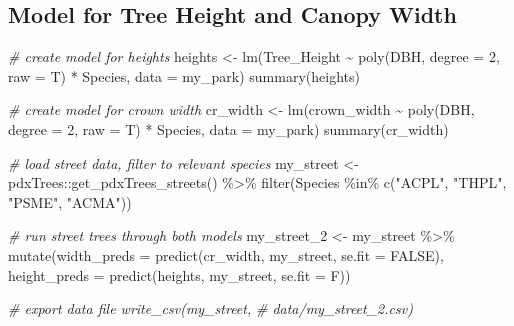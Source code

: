 \documentclass[12pt,twoside]{reedthesis}
\newenvironment{Shaded}{\begin{snugshade}}{\end{snugshade}}
\newcommand{\AttributeTok}[1]{\textcolor[rgb]{0.77,0.63,0.00}{#1}}
\newcommand{\CommentTok}[1]{\textcolor[rgb]{0.56,0.35,0.01}{\textit{#1}}}
\newcommand{\ConstantTok}[1]{\textcolor[rgb]{0.00,0.00,0.00}{#1}}
\newcommand{\DecValTok}[1]{\textcolor[rgb]{0.00,0.00,0.81}{#1}}
\newcommand{\FunctionTok}[1]{\textcolor[rgb]{0.00,0.00,0.00}{#1}}
\newcommand{\NormalTok}[1]{#1}
\newcommand{\OtherTok}[1]{\textcolor[rgb]{0.56,0.35,0.01}{#1}}
\newcommand{\SpecialCharTok}[1]{\textcolor[rgb]{0.00,0.00,0.00}{#1}}
\newcommand{\StringTok}[1]{\textcolor[rgb]{0.31,0.60,0.02}{#1}}
\begin{document}
\hypertarget{model-for-tree-height-and-canopy-width}{%
\subsection*{Model for Tree Height and Canopy Width}\label{model-for-tree-height-and-canopy-width}}

\footnotesize
\begin{Shaded}
\begin{Highlighting}[]
\CommentTok{\# create model for heights}
\NormalTok{heights }\OtherTok{\textless{}{-}} \FunctionTok{lm}\NormalTok{(Tree\_Height }\SpecialCharTok{\textasciitilde{}} \FunctionTok{poly}\NormalTok{(DBH, }\AttributeTok{degree =} \DecValTok{2}\NormalTok{, }\AttributeTok{raw =}\NormalTok{ T) }\SpecialCharTok{*}
\NormalTok{    Species, }\AttributeTok{data =}\NormalTok{ my\_park)}
\FunctionTok{summary}\NormalTok{(heights)}

\CommentTok{\# create model for crown width}
\NormalTok{cr\_width }\OtherTok{\textless{}{-}} \FunctionTok{lm}\NormalTok{(crown\_width }\SpecialCharTok{\textasciitilde{}} \FunctionTok{poly}\NormalTok{(DBH, }\AttributeTok{degree =} \DecValTok{2}\NormalTok{, }\AttributeTok{raw =}\NormalTok{ T) }\SpecialCharTok{*}
\NormalTok{    Species, }\AttributeTok{data =}\NormalTok{ my\_park)}
\FunctionTok{summary}\NormalTok{(cr\_width)}

\CommentTok{\# load street data, filter to relevant species}
\NormalTok{my\_street }\OtherTok{\textless{}{-}}\NormalTok{ pdxTrees}\SpecialCharTok{::}\FunctionTok{get\_pdxTrees\_streets}\NormalTok{() }\SpecialCharTok{\%\textgreater{}\%}
    \FunctionTok{filter}\NormalTok{(Species }\SpecialCharTok{\%in\%} \FunctionTok{c}\NormalTok{(}\StringTok{"ACPL"}\NormalTok{, }\StringTok{"THPL"}\NormalTok{, }\StringTok{"PSME"}\NormalTok{, }\StringTok{"ACMA"}\NormalTok{))}

\CommentTok{\# run street trees through both models}
\NormalTok{my\_street\_2 }\OtherTok{\textless{}{-}}\NormalTok{ my\_street }\SpecialCharTok{\%\textgreater{}\%}
    \FunctionTok{mutate}\NormalTok{(}\AttributeTok{width\_preds =} \FunctionTok{predict}\NormalTok{(cr\_width, my\_street, }\AttributeTok{se.fit =} \ConstantTok{FALSE}\NormalTok{),}
        \AttributeTok{height\_preds =} \FunctionTok{predict}\NormalTok{(heights, my\_street, }\AttributeTok{se.fit =}\NormalTok{ F))}

\CommentTok{\# export data file write\_csv(my\_street,}
\CommentTok{\# \textquotesingle{}data/my\_street\_2.csv\textquotesingle{})}


\end{Highlighting}
\end{Shaded}
\end{document}
